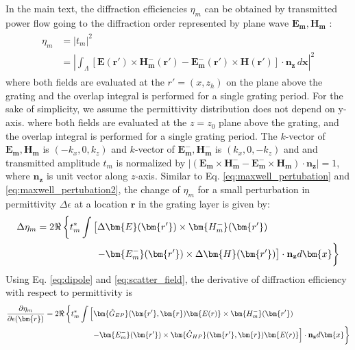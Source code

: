 In the main text, the diffraction efficiencies $\eta_m$ can be obtained by transmitted power flow going to the diffraction order represented by plane wave $\mathbf{E_m},\mathbf{H_m}$ : 
\begin{align}\label{eq:powerflow}
\begin{split}
\eta_m &=\left | t_m \right |^2 \\
&=\left | \int_\Lambda \left[ \mathbf{E}(\bm{r'}) \times \mathbf{H_m^-}(\bm{r'}) - \mathbf{E_m^-}(\bm{r'}) \times  \mathbf{H}(\bm{r'}) \right]\cdot \mathbf{n_z} \, d\bm{x} \right |^2
\end{split}
\end{align}
where both fields are evaluated at the $r'=(x,z_h)$ on the plane above the grating and the overlap integral is performed for a single grating period.
For the sake of simplicity, we assume the permittivity distribution does not depend on y-axis.
where both fields are evaluated at the $z=z_0$ plane above the grating, and the overlap integral is performed for a single grating period. The $k$-vector of $\mathbf{E_m},\mathbf{H_m}$ is $(-k_x,0,k_z)$ and $k$-vector of $\mathbf{E_m^-},\mathbf{H_m^-}$ is $(k_x,0,-k_z)$ and and transmitted amplitude $t_m$ is normalized by $\left| \left( \mathbf{E_m} \times \mathbf{H_m^-} - \mathbf{E_m^-} \times  \mathbf{H_m} \right) \cdot \mathbf{n_z} \right| = 1$, where $\mathbf{n_z}$ is unit vector along $z$-axis.
Similar to Eq. \ref{eq:maxwell_pertubation} and \ref{eq:maxwell_pertubation2}, the change of $\eta_m$ for a small perturbation in permittivity $\Delta \epsilon$ at a location $\bm{r}$ in the grating layer is given by:
\begin{align}\label{eq:deltaDE}
\begin{split}
\Delta\eta_m &= 2\Re \left\{ t_m^\ast 
 \int \left[ \Delta\bm{E}(\bm{r'}) \times \bm{H_{m}^{-}}(\bm{r'})\right. \right. \\
 &\left. \phantom{\int} \left. \hspace{1.7cm} - \bm{E_{m}^{-}}(\bm{r'}) \times  \Delta\bm{H}(\bm{r'})\right] \cdot \mathbf{n_z}  d\bm{x}\right\} 
\end{split}
\end{align}
Using Eq. \ref{eq:dipole} and \ref{eq:scatter_field}, the derivative of diffraction efficiency with respect to permittivity is
\begin{align}\label{eq:deltaDE_greentensor}
\begin{split}
\frac{\partial \eta_m }{\partial \epsilon(\bm{r})} &=  2\Re \left\{ t_m^\ast \int \left[ \bm{\hat{G}_{EP}}(\bm{r'},\bm{r})\bm{E(r)} \times \bm{H_{m}^{-}}(\bm{r'})\right. \right. \\
&\left. \phantom{\int}\left. \hspace{1.7cm} - \bm{E_{m}^{-}}(\bm{r'}) \times  \bm{\hat{G}_{HP}}(\bm{r'},\bm{r})\bm{E(r)}\right] \cdot \mathbf{n_z}  d\bm{x}\right\}
\end{split}
\end{align}
